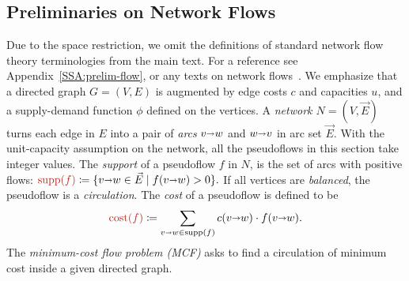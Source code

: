 \documentclass[a4paper,UKenglish]{socg-lipics-v2018}
\def\set#1{\{ #1 \}}
\def\fsupply{\phi}
\def\arcto{\mathord\shortrightarrow}
\def\arc#1#2{#1\arcto#2}
\def\cost{\operatorname{cost}}
\def\supp{\operatorname{supp}}
\theoremstyle{plain}
\numberwithin{figure}{section}
\def\EMPH#1{\textcolor{BrickRed}{{\emph{#1}}}}
\begin{document}
\subsection{Preliminaries on Network Flows}
\label{SS:prelim-flow}

Due to the space restriction, we omit the definitions of standard network flow theory terminologies from the main text.  For a reference see Appendix~\ref{SSA:prelim-flow}, or any texts on network flows~\cite{O93,GHKT17}.
%
We emphasize that a directed graph $G=(V,E)$ is augmented by edge costs $c$ and capacities $u$, and a supply-demand function $\fsupply$ defined on the vertices.  A \EMPH{network $N = (V, \vec{E})$} turns each edge in $E$ into a pair of \EMPH{arcs} $\arc vw$ and $\arc wv$ in arc set $\vec{E}$.
With the unit-capacity assumption on the network, all the pseudoflows in this section take integer values.
The \EMPH{support} of a pseudoflow $f$ in $N$, is the set of arcs with positive flows:
\(
\EMPH{$\supp(f)$} \coloneqq \set{\arc vw \in \vec{E} \mid f(\arc vw) > 0}.
\)
If all vertices are \emph{balanced}, the pseudoflow is a \EMPH{circulation}.
The \EMPH{cost} of a pseudoflow
is defined to be
\[
 \EMPH{$\cost(f)$} \coloneqq \sum_{\arc vw \in \supp(f)} c(\arc vw) \cdot f(\arc vw).
\]
%
The \EMPH{minimum-cost flow problem (MCF)} asks to find a circulation of minimum cost inside a given directed graph.
\end{document}
